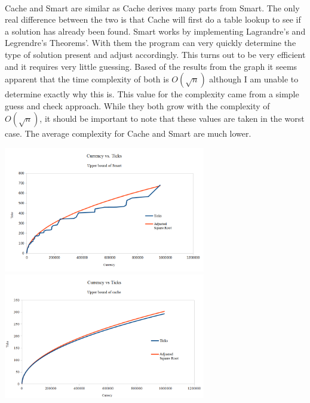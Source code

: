 \documentclass{article}
\theoremstyle{definition}
\begin{document}
\\
\indent Cache and Smart are similar as Cache derives many parts from Smart. The only real difference between the two is that Cache will first do a table lookup to see if a solution has already been found. Smart works by implementing Lagrandre's and Legrendre's Theorems'. With them the program can very quickly determine the type of solution present and adjust accordingly. This turns out to be very efficient and it requires very little guessing. Based of the results from the graph it seems apparent that the time complexity of both is $O(\sqrt{n})$ although I am unable to determine exactly why this is. This value for the complexity came from a simple guess and check approach. While they both grow with the complexity of $O(\sqrt{n})$, it should be important to note that these values are taken in the worst case. The average complexity for Cache and Smart are much lower. 
\begin{center}
\includegraphics[width=333px]{smart_mil_upper}
\includegraphics[width=333px]{cache_mil_upper}
\end{center}
\end{document}
